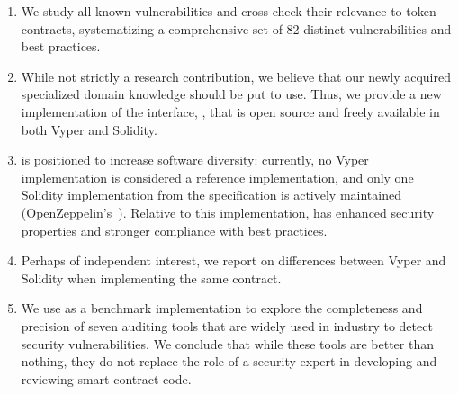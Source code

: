 \begin{enumerate}
\item We study all known vulnerabilities and cross-check their relevance to \erc token contracts, systematizing a comprehensive set of 82 distinct vulnerabilities and best practices. 
\item While not strictly a research contribution, we believe that our newly acquired specialized domain knowledge should be put to use. Thus, we provide a new implementation of the \erc interface, \sys, that is open source and freely available in both Vyper and Solidity.
\item \sys is positioned to increase software diversity: currently, no Vyper \erc implementation is considered a reference implementation, and only one Solidity implementation from the specification is actively maintained (OpenZeppelin's~\cite{OpenZepplin}). Relative to this implementation, \sys has enhanced security properties and stronger compliance with best practices. 
\item Perhaps of independent interest, we report on differences between Vyper and Solidity when implementing the same contract. \item We use \sys as a benchmark implementation to explore the completeness and precision of seven auditing tools that are widely used in industry to detect security vulnerabilities. We conclude that while these tools are better than nothing, they do not replace the role of a security expert in developing and reviewing smart contract code.
\end{enumerate}





